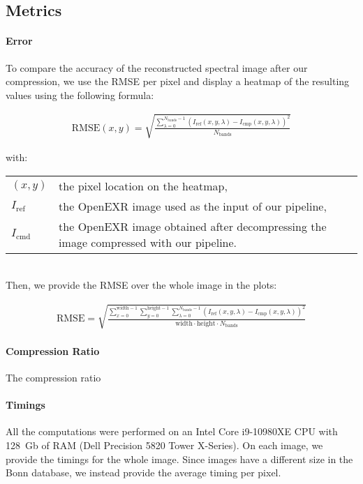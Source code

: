 \subsection{Metrics}

\paragraph{Error}
To compare the accuracy of the reconstructed spectral image after our compression, we use the RMSE per pixel and display a heatmap of the resulting values using the following formula:

\begin{align}
    \mathrm{RMSE}(x, y) = \sqrt{\frac{\sum_{\lambda = 0}^{N_\mathrm{bands} - 1} \left(I_\mathrm{ref}(x, y, \lambda) - I_\mathrm{cmp}(x, y, \lambda) \right)^2}{N_\mathrm{bands}}}
\end{align}

with:

\begin{tabularx}{\linewidth}{lX}
    $(x, y)$ & the pixel location on the heatmap, \\
    $I_\mathrm{ref}$ & the OpenEXR image used as the input of our pipeline, \\
    $I_\mathrm{cmd}$ & the OpenEXR image obtained after decompressing the image compressed with our pipeline. \\
\end{tabularx}\\

Then, we provide the RMSE over the whole image in the plots:

\begin{align}
    \mathrm{RMSE} =
        \sqrt{
            \frac{
                    \sum_{x = 0}^{\mathrm{width} - 1} \sum_{y = 0}^{\mathrm{height} - 1} \sum_{\lambda = 0}^{N_\mathrm{bands} - 1}
                        \left(
                            I_\mathrm{ref}(x, y, \lambda) - I_\mathrm{cmp}(x, y, \lambda)
                        \right)^2
                }
                {\mathrm{width} \cdot \mathrm{height} \cdot N_\mathrm{bands}}
        }
\end{align}


\paragraph{Compression Ratio}

The compression ratio

\paragraph{Timings}

All the computations were performed on an Intel Core i9-10980XE CPU with 128~Gb of RAM (Dell Precision 5820 Tower X-Series). On each image, we provide the timings for the whole image. Since images have a different size in the Bonn database, we instead provide the average timing per pixel.

\clearpage
